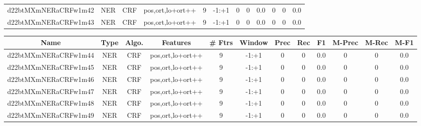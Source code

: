 \documentclass[a4paper]{article}
\begin{document}
\begin{landscape}
\begin{center}
\begin{tabular}{ |c|c|c|c|c|c|c|c|c|c|c|c|}
 
 	
 	\small{ d22btMXmNERaCRFw1m42 } & \small{ NER} & \small{  CRF }  & pos,ort,lo+ort++  &  9 &  \small{  -1:+1 }  &  0 & 0 & 0.0  &  0 & 0 & 0.0 \\
 	

 
 	
 	\small{ d22btMXmNERaCRFw1m43 } & \small{ NER} & \small{  CRF }  & pos,ort,lo+ort++  &  9 &  \small{  -1:+1 }  &  0 & 0 & 0.0  &  0 & 0 & 0.0 \\
 	
 \hline
\end{tabular}
\end{center}




\begin{center}
\begin{tabular}{ |c|c|c|c|c|c|c|c|c|c|c|c|} 
 \hline
 	Name & Type & Algo. & Features & \# Ftrs & Window & Prec & Rec & F1 & M-Prec & M-Rec & M-F1\\
 \hline

 	

 
 	
 	\small{ d22btMXmNERaCRFw1m44 } & \small{ NER} & \small{  CRF }  & pos,ort,lo+ort++  &  9 &  \small{  -1:+1 }  &  0 & 0 & 0.0  &  0 & 0 & 0.0 \\
 	

 
 	
 	\small{ d22btMXmNERaCRFw1m45 } & \small{ NER} & \small{  CRF }  & pos,ort,lo+ort++  &  9 &  \small{  -1:+1 }  &  0 & 0 & 0.0  &  0 & 0 & 0.0 \\
 	

 
 	
 	\small{ d22btMXmNERaCRFw1m46 } & \small{ NER} & \small{  CRF }  & pos,ort,lo+ort++  &  9 &  \small{  -1:+1 }  &  0 & 0 & 0.0  &  0 & 0 & 0.0 \\
 	

 
 	
 	\small{ d22btMXmNERaCRFw1m47 } & \small{ NER} & \small{  CRF }  & pos,ort,lo+ort++  &  9 &  \small{  -1:+1 }  &  0 & 0 & 0.0  &  0 & 0 & 0.0 \\
 	

 
 	
 	\small{ d22btMXmNERaCRFw1m48 } & \small{ NER} & \small{  CRF }  & pos,ort,lo+ort++  &  9 &  \small{  -1:+1 }  &  0 & 0 & 0.0  &  0 & 0 & 0.0 \\
 	

 
 	
 	\small{ d22btMXmNERaCRFw1m49 } & \small{ NER} & \small{  CRF }  & pos,ort,lo+ort++  &  9 &  \small{  -1:+1 }  &  0 & 0 & 0.0  &  0 & 0 & 0.0 \\
 	


\end{tabular}
\end{center}
\end{landscape}
\end{document}
